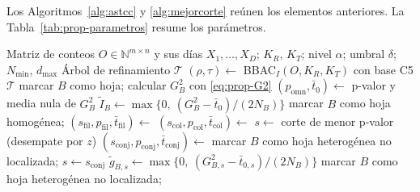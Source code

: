 Los Algoritmos~\ref{alg:astcc} y \ref{alg:mejorcorte} reúnen los elementos
anteriores. La Tabla~\ref{tab:prop-parametros} resume los parámetros.

\begin{algorithm}[t]
\caption{AST-CC: refinamiento jerárquico de ST-CC}\label{alg:astcc}
\begin{algorithmic}[1]
\Require Matriz de conteos $O\in\mathbb{N}^{m\times n}$ y sus días $X_1,\dots,X_D$; $K_R$, $K_T$; nivel $\alpha$; umbral $\delta$; $N_{\min}$, $d_{\max}$
\Ensure Árbol de refinamiento $\mathcal{T}$
\State $(\rho,\tau)\gets$ BBAC$_I(O, K_R, K_T)$ con base C5 
  \State {}
\EndFor
\State \Return $\mathcal{T}$
\Statex
{}
    \State marcar $B$ como hoja; \Return
  \EndIf
  \State calcular $G^2_B$ con \eqref{eq:prop-G2}
  \State $(p_{\mathrm{omn}}, \bar t_0)\gets$ p-valor y media nula de $G^2_B$ 
  \State $\tilde I_B\gets\max\{0,\ (G^2_B-\bar t_0)/(2N_B)\}$
    \State marcar $B$ como hoja homogénea; \Return
  \EndIf
  \State $(s_{\mathrm{fil}},p_{\mathrm{fil}},\bar t_{\mathrm{fil}})\gets$ 
  \State $(s_{\mathrm{col}},p_{\mathrm{col}},\bar t_{\mathrm{col}})\gets$ 
    \State $s\gets$ corte de menor p-valor (desempate por $z$)
  \Else
    \State $(s_{\mathrm{conj}},p_{\mathrm{conj}},\bar t_{\mathrm{conj}})\gets$ 
      \State marcar $B$ como hoja heterogénea no localizada; \Return
    \EndIf
    \State $s\gets s_{\mathrm{conj}}$
  \EndIf
  \State $\tilde g_{B,s}\gets\max\{0,\ (G^2_{B,s}-\bar t_{0,s})/(2N_B)\}$ 
    \State marcar $B$ como hoja heterogénea no localizada; \Return
  \EndIf
    \State {}
  \EndFor
\EndProcedure
\end{algorithmic}
\end{algorithm}

